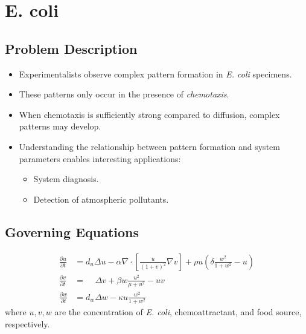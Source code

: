 \documentclass[compress,12pt]{beamer}
\begin{document}
\section{E. coli}






\subsection{Problem Description}
\begin{frame}
  \begin{itemize}
    
    \item Experimentalists observe complex pattern formation in \emph{E. coli} specimens.
    \item These patterns only occur in the presence of \emph{chemotaxis}.
    \item When chemotaxis is sufficiently strong compared to diffusion, complex patterns may develop.
    \item Understanding the relationship between pattern formation and system parameters
          enables interesting applications:
    \begin{itemize}
      \item System diagnosis.
      \item Detection of atmospheric pollutants.
    \end{itemize}
  \end{itemize}
\end{frame}



\subsection{Governing Equations}
\begin{frame}
  \begin{align}
    \frac{\partial u}{\partial t} & = d_u \Delta u - \alpha \nabla \cdot \left[ \frac{u}{(1+ v)^2} \nabla v \right]
                                      + \rho u \left( \delta \frac{w^2}{1 + w^2} - u \right) \nonumber \\
    \frac{\partial v}{\partial t} & = \;\;\;\; \Delta v + \beta w \frac{u^2}{\mu + u^2} - uv \nonumber \\
    \frac{\partial w}{\partial t} & = d_w \Delta w - \kappa u \frac{w^2}{1 + w^2} \nonumber
  \end{align}
  where $u,v,w$ are the concentration of \emph{E. coli}, chemoattractant, and food source, respectively.
\end{frame}
\end{document}

